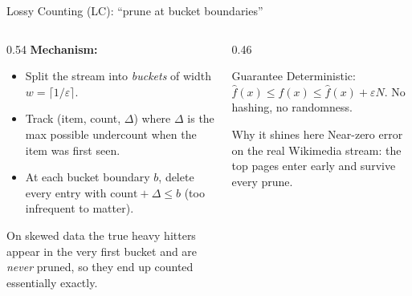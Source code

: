 \documentclass[11pt,aspectratio=169]{beamer}
\begin{document}
\begin{frame}{Lossy Counting (LC): ``prune at bucket boundaries''}
  \begin{columns}[T]
    \begin{column}{0.54\textwidth}
      \textbf{Mechanism:}
      \begin{itemize}
        \item Split the stream into \emph{buckets} of width $w=\lceil 1/\varepsilon\rceil$.
        \item Track (item, count, $\Delta$) where $\Delta$ is the max possible
              undercount when the item was first seen.
        \item At each bucket boundary $b$, \alert{delete every entry with
              $\text{count}+\Delta \le b$} (too infrequent to matter).
      \end{itemize}
      \vspace{0.4em}
      On skewed data the true heavy hitters appear in the very first bucket and
      are \emph{never} pruned, so they end up counted essentially exactly.
    \end{column}
    \begin{column}{0.46\textwidth}
      \begin{block}{Guarantee}
        Deterministic: $\hat f(x)\le f(x)\le \hat f(x)+\varepsilon N$.
        No hashing, no randomness.
      \end{block}
      \begin{exampleblock}{Why it shines here}
        Near-zero error on the real Wikimedia stream: the top pages enter early
        and survive every prune.
      \end{exampleblock}
    \end{column}
  \end{columns}
\end{frame}
\end{document}
